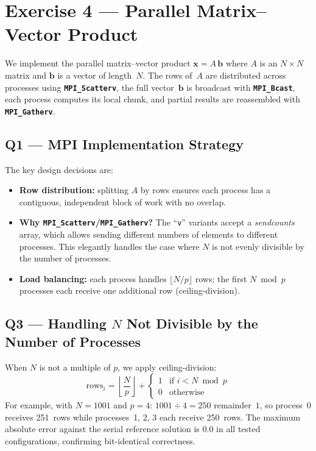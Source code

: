 \documentclass[12pt,a4paper]{article}
\newcommand{\mpiname}[1]{\texttt{\textbf{#1}}}
\begin{document}
\newpage
\section{Exercise 4 — Parallel Matrix–Vector Product}

We implement the parallel matrix–vector product $\mathbf{x} = A\,\mathbf{b}$
where $A$ is an $N\times N$ matrix and $\mathbf{b}$ is a vector of
length~$N$.
The rows of~$A$ are distributed across processes using
\mpiname{MPI\_Scatterv}, the full vector~$\mathbf{b}$ is broadcast with
\mpiname{MPI\_Bcast}, each process computes its local chunk, and partial
results are reassembled with \mpiname{MPI\_Gatherv}.

\subsection{Q1 — MPI Implementation Strategy}

The key design decisions are:

\begin{itemize}[leftmargin=1.5em]
  \item \textbf{Row distribution:} splitting $A$ by rows ensures each
        process has a contiguous, independent block of work with no overlap.
  \item \textbf{Why \mpiname{MPI\_Scatterv}/\mpiname{MPI\_Gatherv}?}
        The ``\texttt{v}'' variants accept a \textit{sendcounts} array,
        which allows sending different numbers of elements to different
        processes.  This elegantly handles the case where $N$ is not
        evenly divisible by the number of processes.
  \item \textbf{Load balancing:} each process handles
        $\lfloor N/p \rfloor$ rows; the first $N \bmod p$ processes each
        receive one additional row (ceiling-division).
\end{itemize}

\subsection{Q3 — Handling $N$ Not Divisible by the Number of Processes}

\begin{answerbox}
When $N$ is not a multiple of $p$, we apply ceiling-division:
\[
  \text{rows}_i =
  \left\lfloor \frac{N}{p} \right\rfloor +
  \begin{cases} 1 & \text{if } i < N \bmod p \\ 0 & \text{otherwise} \end{cases}
\]
For example, with $N = 1001$ and $p = 4$:
$1001 \div 4 = 250$ remainder~$1$, so process~0 receives 251~rows while
processes~1, 2, 3 each receive 250~rows.
The maximum absolute error against the serial reference solution is
$0.0$ in all tested configurations, confirming bit-identical correctness.
\end{answerbox}
\end{document}
